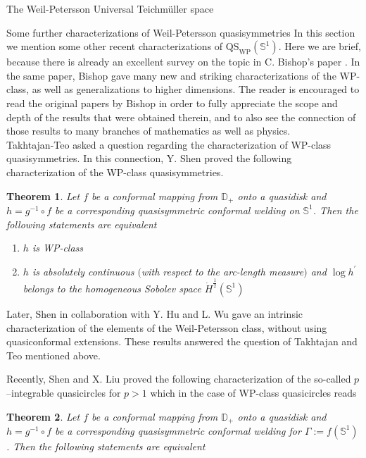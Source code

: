 \documentclass[12pt]{amsart}
\theoremstyle{plain}
\newtheorem{theorem}{Theorem}[section]
\theoremstyle{definition}
\theoremstyle{remark}
\numberwithin{equation}{section} %
\numberwithin{figure}{section} %
\begin{document}
\begin{section}{The Weil-Petersson Universal Teichm\"uller space}
\begin{subsection}{Some further characterizations of Weil-Petersson quasisymmetries}
  In this section we mention some other recent characterizations of $\mathrm{QS}_{\mathrm{WP}}(\mathbb{S}^1)$. Here we are brief, because there is already an excellent survey on the topic in C. Bishop's  paper \cite{Bishop2}. In the same paper, Bishop gave many new and striking characterizations of the WP-class, as well as generalizations to higher dimensions. The reader is encouraged to read the original papers by Bishop \cite{Bishop1, Bishop2} in order to fully appreciate the scope and depth of the results that were obtained therein, and to also see the connection of those results to many branches of mathematics as well as physics.\\
  
Takhtajan-Teo \cite{Takhtajan_Teo_Memoirs} asked a question regarding the characterization of WP-class quasisymmetries.  In this connection, Y. Shen \cite{Shen_characterization} proved the following characterization of the WP-class quasisymmetries.
  \begin{theorem}\label{shen charac}  Let \(f\) be a conformal mapping from \(\mathbb{D}_+\) onto
a quasidisk and \(h=g^{-1} \circ f\) be a corresponding quasisymmetric
conformal welding on $\mathbb{S}^{1}$. Then the following statements are equivalent
\begin{enumerate}[font=\upshape]
    \item  \(h\) is \emph{WP}-class
    \item \(h\) is absolutely continuous $($with respect to the arc-length measure$)$ and \(\log h^{\prime}\) belongs to the homogeneous Sobolev space
 \(\dot{H}^{\frac{1}{2}}\left(\mathbb{S}^{1}\right)\)
\end{enumerate}
\end{theorem} 
Later, Shen in collaboration with Y. Hu and L. Wu \cite{Shenwuhu} gave an intrinsic characterization of the elements of the Weil-Petersson class, without using quasiconformal extensions. These results answered the question of Takhtajan and Teo mentioned above.

Recently, Shen and X. Liu \cite{shenliu} proved the following characterization of the so-called $p$--integrable quasicircles for $p>1$ which in the case of WP-class quasicircles reads

\begin{theorem}\label{shen-liu}
    Let \(f\) be a conformal mapping from \(\mathbb{D}_+\) onto
a quasidisk and \(h=g^{-1} \circ f\) be a corresponding quasisymmetric
conformal welding 
 for \(\Gamma := f\left(\mathbb{S}^{1}\right)\). Then the following statements are equivalent


\end{theorem}
\end{subsection}
\end{section}
\end{document}
